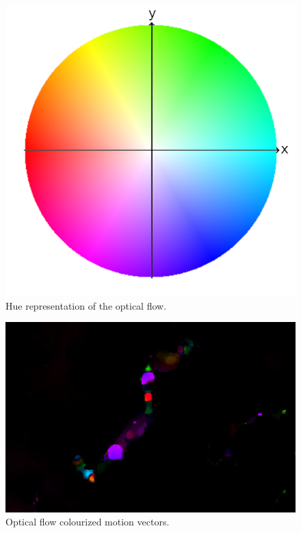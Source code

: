 \documentclass[12pt, a4paper]{report}
\begin{document}
	\begin{figure}[h!]
		\centering
		\includegraphics[scale=0.3]{../images/colorwheel.png}
		\caption{Hue representation of the optical flow.}
		\label{fig:hue_colour_wheel}
	\end{figure}
	
	\begin{figure}[h!]
		\includegraphics[width=\linewidth]{../images/LC81940282013341LGN01_Motion Vectros_color_small.png}
		\caption{Optical flow colourized motion vectors.}
		\label{fig:NDSI}
	\end{figure}
	
\end{document}
